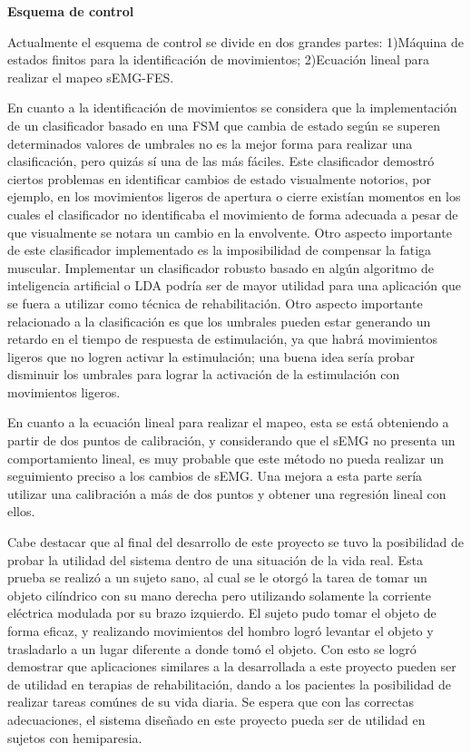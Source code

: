 \textbf{Esquema de control}
\hfill \break

Actualmente el esquema de control se divide en dos grandes partes: 1)Máquina de estados finitos para la identificación de movimientos; 2)Ecuación lineal para realizar el mapeo sEMG-FES.

En cuanto a la identificación de movimientos se considera que la implementación de un clasificador basado en una FSM que cambia de estado según se superen determinados valores de umbrales no es la mejor forma para realizar una clasificación, pero quizás sí una de las más fáciles. Este clasificador demostró ciertos problemas en identificar cambios de estado visualmente notorios, por ejemplo, en los movimientos ligeros de apertura o cierre existían momentos en los cuales el clasificador no identificaba el movimiento de forma adecuada a pesar de que visualmente se notara un cambio en la envolvente. Otro aspecto importante de este clasificador implementado es la imposibilidad de compensar la fatiga muscular. Implementar un clasificador robusto basado en algún algoritmo de inteligencia artificial o LDA podría ser de mayor utilidad para una aplicación que se fuera a utilizar como técnica de rehabilitación. Otro aspecto importante relacionado a la clasificación es que los umbrales pueden estar generando un retardo en el tiempo de respuesta de estimulación, ya que habrá movimientos ligeros que no logren activar la estimulación; una buena idea sería probar disminuir los umbrales para lograr la activación de la estimulación con movimientos ligeros.

En cuanto a la ecuación lineal para realizar el mapeo, esta se está obteniendo a partir de dos puntos de calibración, y considerando que el sEMG no presenta un comportamiento lineal, es muy probable que este método no pueda realizar un seguimiento preciso a los cambios de sEMG. Una mejora a esta parte sería utilizar una calibración a más de dos puntos y obtener una regresión lineal con ellos.
\hfill \break

Cabe destacar que al final del desarrollo de este proyecto se tuvo la posibilidad de probar la utilidad del sistema dentro de una situación de la vida real. Esta prueba se realizó a un sujeto sano, al cual se le otorgó la tarea de tomar un objeto cilíndrico con su mano derecha pero utilizando solamente la corriente eléctrica modulada por su brazo izquierdo. El sujeto pudo tomar el objeto de forma eficaz, y realizando movimientos del hombro logró levantar el objeto y trasladarlo a un lugar diferente a donde tomó el objeto. Con esto se logró demostrar que aplicaciones similares a la desarrollada a este proyecto pueden ser de utilidad en terapias de rehabilitación, dando a los pacientes la posibilidad de realizar tareas comúnes de su vida diaria. Se espera que con las correctas adecuaciones, el sistema diseñado en este proyecto pueda ser de utilidad en sujetos con hemiparesia.

